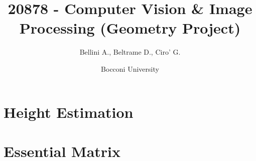 \documentclass{article}
\title{20878 - Computer Vision \& Image Processing (Geometry Project)}
\author{Bellini A., Beltrame D., Ciro' G.}
\date{Bocconi University}
\begin{document}
\pagestyle{fancy}
\maketitle
\section{Height Estimation}

\section{Essential Matrix}
\end{document}
